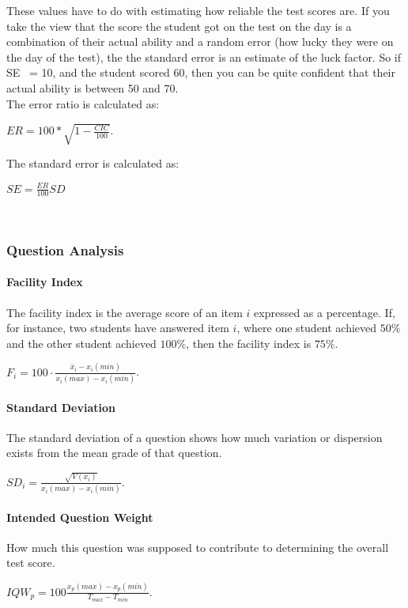 \documentclass[12pt]{report}
\begin{document}
These values have to do with estimating how reliable the test scores are.
If you take the view that the score the student got on the test on the day is a combination
 of their actual ability and a random error
  (how lucky they were on the day of the test),
   the the standard error is an estimate of the luck factor. So if SE ~= 10, and the student scored 60, then you can be quite confident
    that their actual ability is between 50 and 70.\\

The error ratio is calculated as:

$ER=100*\sqrt{1-\frac{CIC}{100}}$.

The standard error is calculated as:

$SE=\frac{ER}{100}SD$

\ \\

\subsubsection{Question Analysis}
\label{subsubsec:questions}

\paragraph{Facility Index}
The facility index is the average score of an item $i$ expressed as a percentage. If, for instance, two students have answered item $i$, where one student achieved $50\%$ and the other student achieved $100\%$, then the facility index is $75\%$.

$F_i = 100\cdot\frac{\bar{x}_i - x_i(min)}{x_i(max) - x_i(min)}$. 

\paragraph{Standard Deviation}
The standard deviation of a question shows how much variation or dispersion exists from the mean grade of that question. 

$SD_i = \frac{\sqrt{V(x_i)}}{x_i(max) - x_i(min)}$.

\paragraph{Intended Question Weight}

How much this question was supposed to contribute to determining the overall test score.

$IQW_p = 100\frac{x_p(max) - x_p(min)}{T_{max} - T_{min}}$.\\
\end{document}
